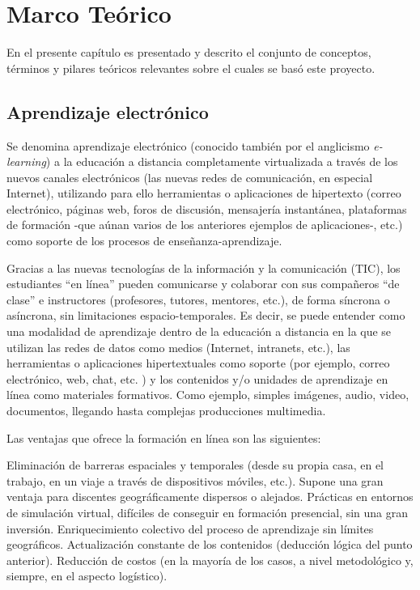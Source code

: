 \chapter{Marco Teórico}
\thispagestyle{empty} %

En el presente capítulo es presentado y descrito el conjunto de conceptos, términos y pilares teóricos relevantes sobre el cuales se basó este proyecto.


\section{Aprendizaje electrónico}

Se denomina aprendizaje electrónico (conocido también por el anglicismo \emph{e-learning}) a la educación a distancia completamente virtualizada a través de los nuevos canales electrónicos (las nuevas redes de comunicación, en especial Internet), utilizando para ello herramientas o aplicaciones de hipertexto (correo electrónico, páginas web, foros de discusión, mensajería instantánea, plataformas de formación -que aúnan varios de los anteriores ejemplos de aplicaciones-, etc.) como soporte de los procesos de enseñanza-aprendizaje.

Gracias a las nuevas tecnologías de la información y la comunicación (TIC), los estudiantes “en línea” pueden comunicarse y colaborar con sus compañeros “de clase” e instructores (profesores, tutores, mentores, etc.), de forma síncrona o asíncrona, sin limitaciones espacio-temporales. Es decir, se puede entender como una modalidad de aprendizaje dentro de la educación a distancia en la que se utilizan las redes de datos como medios (Internet, intranets, etc.), las herramientas o aplicaciones hipertextuales como soporte (por ejemplo, correo electrónico, web, chat, etc. ) y los contenidos y/o unidades de aprendizaje en línea como materiales formativos. Como ejemplo, simples imágenes, audio, video, documentos, llegando hasta complejas producciones multimedia.

Las ventajas que ofrece la formación en línea son las siguientes:

Eliminación de barreras espaciales y temporales (desde su propia casa, en el trabajo, en un viaje a través de dispositivos móviles, etc.). Supone una gran ventaja para discentes geográficamente dispersos o alejados.
Prácticas en entornos de simulación virtual, difíciles de conseguir en formación presencial, sin una gran inversión.
Enriquecimiento colectivo del proceso de aprendizaje sin límites geográficos.
Actualización constante de los contenidos (deducción lógica del punto anterior).
Reducción de costos (en la mayoría de los casos, a nivel metodológico y, siempre, en el aspecto logístico).


